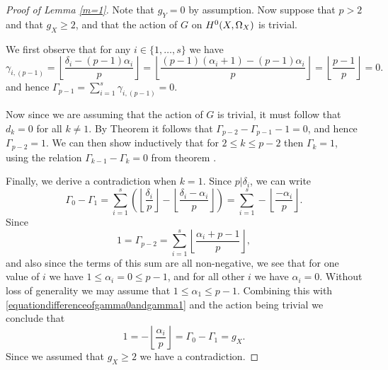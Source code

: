     \begin{proof}[Proof of Lemma \ref{m=1}]
    Note that $g_Y= 0$ by assumption.
    Now suppose that $p >2$ and that $g_X  \geq 2$, and that the action of $G$ on ${H^0(X,\Omega_X)}$ is trivial.
    
    We first observe that for any $i \in \{1, \ldots, s \}$ we have
        \[
        \gamma_{i, (p-1)} = \left \lfloor \frac{\delta_i - (p-1)\alpha_i}{p} \right \rfloor  = \left \lfloor \frac{(p-1)(\alpha_i + 1) - (p-1)\alpha_i}{p} \right \rfloor  = \left \lfloor \frac{p-1}{p} \right \rfloor = 0.
        \]  
    and hence $\Gamma_{p-1} = \sum_{ i=1}^s \gamma_{i, (p-1)} = 0$.

    Now since we are assuming that the action of $G$ is trivial, it must follow that $d_k = 0$ for all $k \neq 1$.
    By Theorem  it follows that $\Gamma_{p-2} - \Gamma_{p-1} -1 = 0$, and hence $\Gamma_{p-2} = 1$.
    We can then show inductively that for $2 \leq k \leq p-2$ then $\Gamma_k = 1$, using the relation $\Gamma_{k-1} - \Gamma_k = 0$ from theorem .

    Finally, we derive a contradiction when $k =1$.
    Since $p | \delta_i$, we can write 
        \begin{equation}\label{equationdifferenceofgamma0andgamma1}
        \Gamma_0  - \Gamma_1 = \sum_{i=1}^s \left( \left \lfloor \frac{\delta_i}{p} \right \rfloor - \left \lfloor \frac{\delta_i - \alpha_i}{p} \right \rfloor \right) = \sum_{i=1}^s -\left\lfloor \frac{-\alpha_i}{p} \right \rfloor.
        \end{equation}
    Since
        \[
        1 = \Gamma_{p-2} = \sum_{i=1}^s \left\lfloor \frac{\alpha_i + p -1}{p} \right \rfloor,
        \]
    and also since the terms of this sum are all non-negative, we see that for one value of $i$ we have $1 \leq \alpha_i=0 \leq p-1$, and for all other $i$ we have $\alpha_i = 0$.
    Without loss of generality we may assume that $ 1 \leq \alpha_1 \leq p-1$.
    Combining this with \eqref{equationdifferenceofgamma0andgamma1} and the action being trivial  we conclude that
        \[
        1 = - \left \lfloor \frac{\alpha_i}{p} \right \rfloor = \Gamma_0 - \Gamma_1 = g_X.
        \]  
    Since we assumed that $g_X \geq 2$ we have a contradiction.
    \end{proof}


